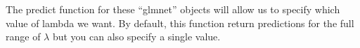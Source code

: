 \documentclass[]{article}
\newenvironment{Shaded}{\begin{snugshade}}{\end{snugshade}}
\newcommand{\KeywordTok}[1]{\textcolor[rgb]{0.13,0.29,0.53}{\textbf{{#1}}}}
\newcommand{\DataTypeTok}[1]{\textcolor[rgb]{0.13,0.29,0.53}{{#1}}}
\newcommand{\DecValTok}[1]{\textcolor[rgb]{0.00,0.00,0.81}{{#1}}}
\newcommand{\StringTok}[1]{\textcolor[rgb]{0.31,0.60,0.02}{{#1}}}
\newcommand{\NormalTok}[1]{{#1}}
\begin{document}
The predict function for these ``glmnet'' objects will allow us to
specify which value of lambda we want. By default, this function return
predictions for the full range of \(\lambda\) but you can also specify a
single value.

\begin{Shaded}
\end{Shaded}
\end{document}
